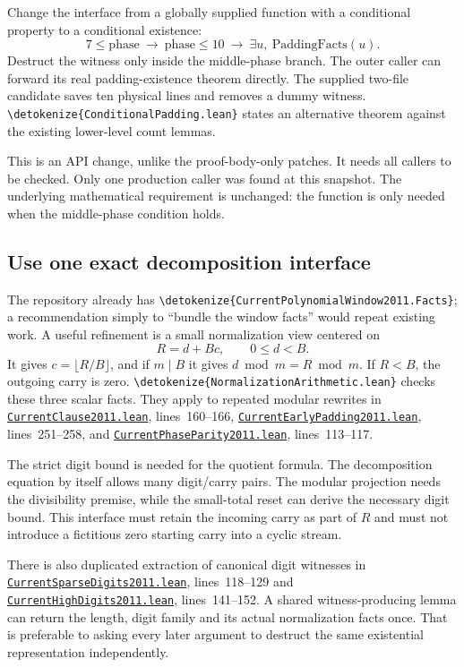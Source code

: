 \documentclass[11pt,letterpaper]{article}
\newcommand{\code}[1]{\expandafter\nolinkurl\expandafter{\detokenize{#1}}}
\newcommand{\repo}{https://github.com/VladimirReshetnikov/ProveIt/blob/60e9c5d620c6c387d932876cfa2d9376f64ea56c}
\newcommand{\src}[2]{\href{\repo/Computability/DiophantineConsistency/Lean/DiophantineConsistency/#1.lean}{\nolinkurl{#1.lean}}, lines~#2}
\begin{document}
Change the interface from a globally supplied function with a conditional property to a conditional existence:
\[
7\le\mathrm{phase}\ \longrightarrow\ \mathrm{phase}\le10
\ \longrightarrow\ \exists u,\ \mathrm{PaddingFacts}(u).
\]
Destruct the witness only inside the middle-phase branch. The outer caller can forward its real padding-existence theorem directly. The supplied two-file candidate saves ten physical lines and removes a dummy witness. \code{ConditionalPadding.lean} states an alternative theorem against the existing lower-level count lemmas.

This is an API change, unlike the proof-body-only patches. It needs all callers to be checked. Only one production caller was found at this snapshot. The underlying mathematical requirement is unchanged: the function is only needed when the middle-phase condition holds.

\subsection{Use one exact decomposition interface}

The repository already has \code{CurrentPolynomialWindow2011.Facts}; a recommendation simply to ``bundle the window facts'' would repeat existing work. A useful refinement is a small normalization view centered on
\[
R=d+B c,\qquad 0\le d<B.
\]
It gives $c=\lfloor R/B\rfloor$, and if $m\mid B$ it gives $d\bmod m=R\bmod m$. If $R<B$, the outgoing carry is zero. \code{NormalizationArithmetic.lean} checks these three scalar facts. They apply to repeated modular rewrites in \src{CurrentClause2011}{160--166}, \src{CurrentEarlyPadding2011}{251--258}, and \src{CurrentPhaseParity2011}{113--117}.

The strict digit bound is needed for the quotient formula. The decomposition equation by itself allows many digit/carry pairs. The modular projection needs the divisibility premise, while the small-total reset can derive the necessary digit bound. This interface must retain the incoming carry as part of $R$ and must not introduce a fictitious zero starting carry into a cyclic stream.

There is also duplicated extraction of canonical digit witnesses in \src{CurrentSparseDigits2011}{118--129} and \src{CurrentHighDigits2011}{141--152}. A shared witness-producing lemma can return the length, digit family and its actual normalization facts once. That is preferable to asking every later argument to destruct the same existential representation independently.
\end{document}
